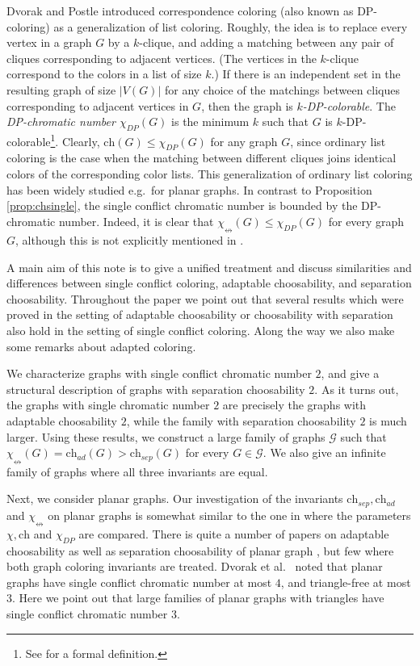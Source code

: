 \documentclass[12pt]{article}
\newcommand{\single}{\chi_{\nleftrightarrow}}
\newcommand{\ch}{\mathrm{ch}}
\begin{document}
Dvorak and Postle \cite{DvorakPostle} introduced correspondence coloring
(also known as DP-coloring) as a generalization of list coloring. 
Roughly, the idea is to replace every vertex in a graph $G$ 
by a $k$-clique, and adding a matching between any pair
of cliques corresponding to adjacent 
vertices. (The vertices in the $k$-clique correspond to the colors in a 
list of size $k$.)
If there is an independent set
in the resulting graph of size $|V(G)|$ for any choice of the matchings 
between	cliques corresponding to adjacent vertices in $G$, then the 
graph is {\em $k$-DP-colorable}.
The {\em DP-chromatic number $\chi_{DP}(G)$} is the minimum $k$ such 
that $G$ is $k$-DP-colorable\footnote{See \cite{DvorakPostle} for a 
formal definition.}.  Clearly, $\ch(G) \leq \chi_{DP}(G)$
for any graph $G$, since ordinary list coloring is the case when the 
matching between different cliques joins identical colors of the 
corresponding color lists.
This generalization of ordinary list coloring has been widely studied 
e.g.\ for planar graphs. 
In contrast to Proposition \ref{prop:chsingle}, the single conflict 
chromatic number is bounded by the DP-chromatic number.
Indeed, it is clear that $\single(G) \leq \chi_{DP}(G)$
for every graph $G$, although this is not explicitly mentioned in 
\cite{DvorakEsperetKangOzeki}.

    
A main aim of this note is to give a unified treatment and discuss similarities and differences between single conflict coloring, adaptable choosability, and separation choosability.
Throughout the paper
we point out that several results which were proved in the setting of adaptable
choosability or choosability with separation also hold in the setting of single conflict 
coloring. Along the way we also make some remarks about adapted coloring.


We characterize graphs with single conflict chromatic number $2$, and give a structural description of graphs
with separation choosability $2$. 
As it turns out, the graphs with single chromatic number
$2$ are precisely the graphs with adaptable choosability $2$, while the family with
separation choosability $2$ is much larger.
Using these results, we
construct a large family of graphs $\mathcal{G}$ such that
$\single(G) =\ch_{ad}(G) > \ch_{sep}(G)$ for every $G \in \mathcal{G}$. 
We also give an infinite family of graphs where all three invariants are equal.




	

Next, we consider planar graphs. Our investigation of the invariants $\ch_{sep}, \ch_{ad}$
and $\single$
on planar graphs is somewhat similar to the one in 
\cite{Abe} where the parameters $\chi, \ch$ and
$\chi_{DP}$ are compared.
There is quite a number of papers on adaptable choosability as well as 
separation choosability of planar graph \cite{HellZhu,CasselgrenGranholmRaspaud,ChenLihWang,
EsperetMontassierZhu,Choi, ChenLihWang}, but few where both graph coloring invariants are treated.
Dvorak et al.\ \cite{DvorakEsperetKangOzeki} noted that planar graphs have single conflict chromatic 
number at most $4$, and triangle-free at most $3$.
 Here we point out that large families of planar 
 graphs with triangles
have single conflict chromatic number $3$.
\end{document}
